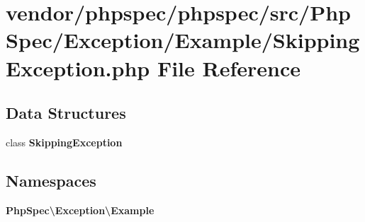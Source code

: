 \section{vendor/phpspec/phpspec/src/\+Php\+Spec/\+Exception/\+Example/\+Skipping\+Exception.php File Reference}
\label{_skipping_exception_8php}
\subsection*{Data Structures}
\begin{DoxyCompactItemize}
\item 
class {\bf Skipping\+Exception}
\end{DoxyCompactItemize}
\subsection*{Namespaces}
\begin{DoxyCompactItemize}
\item 
 {\bf Php\+Spec\textbackslash{}\+Exception\textbackslash{}\+Example}
\end{DoxyCompactItemize}
